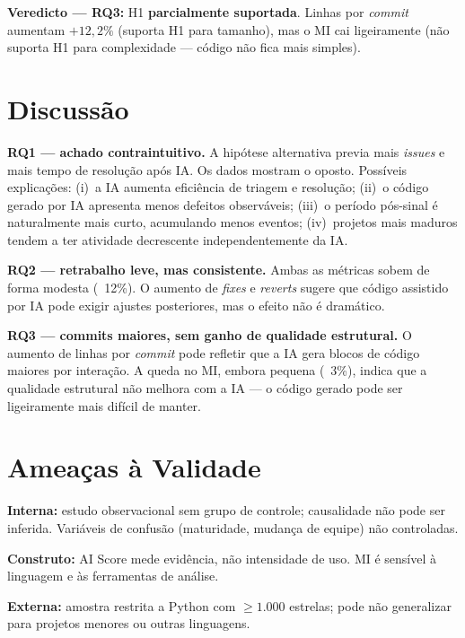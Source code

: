 \documentclass[12pt,a4paper,twocolumn]{article}
\begin{document}
\textbf{Veredicto — RQ3:} H1 \textbf{parcialmente suportada}. Linhas por
\textit{commit} aumentam $+12{,}2\%$ (suporta H1 para tamanho), mas o MI cai
ligeiramente (não suporta H1 para complexidade — código não fica mais simples).

\section{Discussão}

\textbf{RQ1 — achado contraintuitivo.} A hipótese alternativa previa mais
\textit{issues} e mais tempo de resolução após IA. Os dados mostram o oposto.
Possíveis explicações: (i)~a IA aumenta eficiência de triagem e resolução;
(ii)~o código gerado por IA apresenta menos defeitos observáveis;
(iii)~o período pós-sinal é naturalmente mais curto, acumulando menos eventos;
(iv)~projetos mais maduros tendem a ter atividade decrescente
independentemente da IA.

\textbf{RQ2 — retrabalho leve, mas consistente.} Ambas as métricas sobem
de forma modesta (~12\%). O aumento de \textit{fixes} e \textit{reverts}
sugere que código assistido por IA pode exigir ajustes posteriores, mas
o efeito não é dramático.

\textbf{RQ3 — commits maiores, sem ganho de qualidade estrutural.} O
aumento de linhas por \textit{commit} pode refletir que a IA gera blocos
de código maiores por interação. A queda no MI, embora pequena (~3\%),
indica que a qualidade estrutural não melhora com a IA — o código gerado
pode ser ligeiramente mais difícil de manter.

\section{Ameaças à Validade}

\textbf{Interna:} estudo observacional sem grupo de controle; causalidade não pode
ser inferida. Variáveis de confusão (maturidade, mudança de equipe) não controladas.

\textbf{Construto:} AI Score mede evidência, não intensidade de uso. MI é sensível
à linguagem e às ferramentas de análise.

\textbf{Externa:} amostra restrita a Python com $\geq 1{.}000$ estrelas; pode não
generalizar para projetos menores ou outras linguagens.
\end{document}
